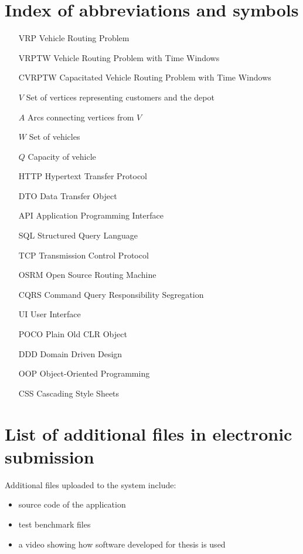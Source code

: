 \documentclass[a4paper,twoside,12pt]{book}
\begin{document}
\begin{appendices} 


 

\chapter*{Index of abbreviations and symbols}

\begin{itemize}
\item[VRP] Vehicle Routing Problem
\item[VRPTW] Vehicle Routing Problem with Time Windows
\item[CVRPTW] Capacitated Vehicle Routing Problem with Time Windows
\item[$V$] Set of vertices representing customers and the depot
\item[$A$] Arcs connecting vertices from $V$
\item[$W$] Set of vehicles
\item[$Q$] Capacity of vehicle
\item[HTTP] Hypertext Transfer Protocol
\item[DTO] Data Transfer Object
\item[API] Application Programming Interface
\item[SQL] Structured Query Language
\item[TCP] Transmission Control Protocol
\item[OSRM] Open Source Routing Machine
\item[CQRS] Command Query Responsibility Segregation
\item[UI] User Interface
\item[POCO] Plain Old CLR Object
\item[DDD] Domain Driven Design
\item[OOP] Object-Oriented Programming
\item[CSS] Cascading Style Sheets
\end{itemize}

\chapter*{List of additional files in electronic submission }

Additional files uploaded to the system include:
\begin{itemize}
\item source code of the application
\item test benchmark files
\item a video showing how software developed for thesis is used
\end{itemize}
 
\listoffigures
{}
\listoftables
{}
	

\end{appendices}
\end{document}
